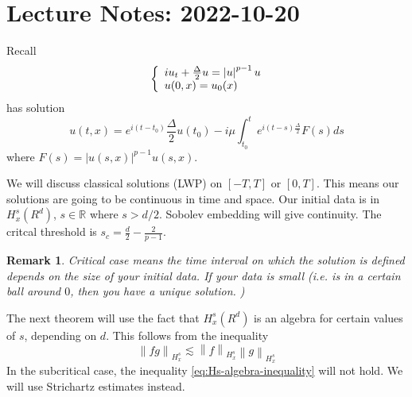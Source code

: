 \documentclass{article}
\newtheorem{remark}{Remark}
\def\R{\mathbb{R}} %
\newcommand\norm[1]{\left\lVert#1\right\rVert}
\begin{document}
\section{Lecture Notes: 2022-10-20}
Recall
\begin{equation}\label{eq:nonlinear-schrodinger-equation}
  \left\{
    \begin{array}{l@{}l}
      iu_{t} +\frac{\Delta}{2}u=\left| u \right|^{p-1}u\\
      u(0,x) = u_{0}(x)
    \end{array}
  \right.
\end{equation}
has solution
\begin{equation*}
  u(t,x)= e^{i(t-t_{0})}\frac{\Delta}{2}u(t_{0}) - i\mu \int_{t_{0}}^{t}e^{i(t-s)\frac{\Delta}{2}}F(s)ds 
\end{equation*}
where $F(s) = |u(s,x)|^{p-1}u(s,x)$.

We will discuss classical solutions (LWP) on $[-T,T]$ or $[0,T]$. This means our
solutions are going to be continuous in time and space. Our initial data is in
$H_{x}^{s}(R^{d})$, $s\in\R$ where $s>d/2$. Sobolev embedding will give
continuity. The critcal threshold is $s_{c}=\frac{d}{2}-\frac{2}{p-1}$.


\begin{remark}
  Critical case means the time interval on which the solution is defined depends
  on the size of your initial data. If your data is small (i.e. is in a certain
  ball around $0$, then you have a unique solution. )
\end{remark}

The next theorem will use the fact that $H_{x}^{s}(R^{d})$ is an algebra for
certain values of $s$, depending on $d$.  This follows from the inequality
\begin{equation}\label{eq:Hs-algebra-inequality}
  \norm{fg}_{H^{s}_{x}} 
  \lesssim \norm{f}_{H^{s}_{x}}\norm{g}_{H_{x}^{s}}
\end{equation}
In the subcritical case, the inequality \cref{eq:Hs-algebra-inequality} will not
hold. We will use Strichartz estimates instead.
\end{document}

